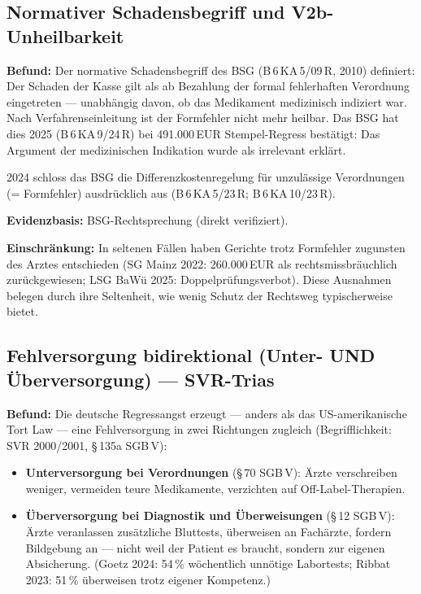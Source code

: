 \documentclass{umbruch-position}
\begin{document}
\subsection{Normativer Schadensbegriff und V2b-Unheilbarkeit}

\textbf{Befund:} Der normative Schadensbegriff des BSG (B\,6\,KA\,5/09\,R, 2010) definiert: Der Schaden der Kasse gilt als ab Bezahlung der formal fehlerhaften Verordnung eingetreten --- unabh\"angig davon, ob das Medikament medizinisch indiziert war. Nach Verfahrenseinleitung ist der Formfehler nicht mehr heilbar. Das BSG hat dies 2025 (B\,6\,KA\,9/24\,R) bei 491.000\,EUR Stempel-Regress best\"atigt: Das Argument der medizinischen Indikation wurde als irrelevant erkl\"art.

2024 schloss das BSG die Differenzkostenregelung f\"ur \glqq{}unzul\"assige\grqq{} Verordnungen (= Formfehler) ausdr\"ucklich aus (B\,6\,KA\,5/23\,R; B\,6\,KA\,10/23\,R).

\textbf{Evidenzbasis:} BSG-Rechtsprechung (direkt verifiziert).

\textbf{Einschr\"ankung:} In seltenen F\"allen haben Gerichte trotz Formfehler zugunsten des Arztes entschieden (SG Mainz 2022: 260.000\,EUR als rechtsmissbr\"auchlich zur\"uckgewiesen; LSG BaW\"u 2025: Doppelpr\"ufungsverbot). Diese Ausnahmen belegen durch ihre Seltenheit, wie wenig Schutz der Rechtsweg typischerweise bietet.

\subsection{Fehlversorgung bidirektional (Unter- UND \"Uberversorgung) --- SVR-Trias}

\textbf{Befund:} Die deutsche Regressangst erzeugt --- anders als das US-amerikanische Tort Law --- eine Fehlversorgung in zwei Richtungen zugleich (Begrifflichkeit: SVR 2000/2001, \S\,135a SGB\,V):

\begin{itemize}
  \item \textbf{Unterversorgung bei Verordnungen} (\S\,70 SGB\,V): \"Arzte verschreiben weniger, vermeiden teure Medikamente, verzichten auf Off-Label-Therapien.
  \item \textbf{\"Uberversorgung bei Diagnostik und \"Uberweisungen} (\S\,12 SGB\,V): \"Arzte veranlassen zus\"atzliche Bluttests, \"uberweisen an Fach\"arzte, fordern Bildgebung an --- nicht weil der Patient es braucht, sondern zur eigenen Absicherung. (Goetz 2024: 54\,\% w\"ochentlich unn\"otige Labortests; Ribbat 2023: 51\,\% \"uberweisen trotz eigener Kompetenz.)
\end{itemize}
\end{document}
